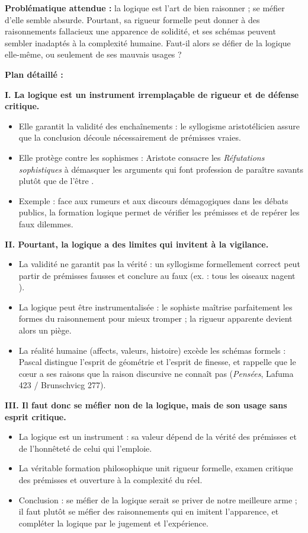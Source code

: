 \documentclass[11pt]{article}
\begin{document}
\begin{corrige}
\textbf{Problématique attendue :} la logique est l'art de bien raisonner ; se méfier d'elle semble absurde. Pourtant, sa rigueur formelle peut donner à des raisonnements fallacieux une apparence de solidité, et ses schémas peuvent sembler inadaptés à la complexité humaine. Faut-il alors se défier de la logique elle-même, ou seulement de ses mauvais usages ?

\textbf{Plan détaillé :}

\textbf{I. La logique est un instrument irremplaçable de rigueur et de défense critique.}
\begin{itemize}
\item Elle garantit la validité des enchaînements : le syllogisme aristotélicien assure que la conclusion découle nécessairement de prémisses vraies.
\item Elle protège contre les sophismes : Aristote consacre les \emph{Réfutations sophistiques} à démasquer les arguments qui \guillemotleft font profession de paraître savants plutôt que de l'être \guillemotright.
\item Exemple : face aux rumeurs et aux discours démagogiques dans les débats publics, la formation logique permet de vérifier les prémisses et de repérer les faux dilemmes.
\end{itemize}

\textbf{II. Pourtant, la logique a des limites qui invitent à la vigilance.}
\begin{itemize}
\item La validité ne garantit pas la vérité : un syllogisme formellement correct peut partir de prémisses fausses et conclure au faux (ex. : \guillemotleft tous les oiseaux nagent \guillemotright).
\item La logique peut être instrumentalisée : le sophiste maîtrise parfaitement les formes du raisonnement pour mieux tromper ; la rigueur apparente devient alors un piège.
\item La réalité humaine (affects, valeurs, histoire) excède les schémas formels : Pascal distingue l'esprit de géométrie et l'esprit de finesse, et rappelle que le cœur a ses raisons que la raison discursive ne connaît pas (\emph{Pensées}, Lafuma 423 / Brunschvicg 277).
\end{itemize}

\textbf{III. Il faut donc se méfier non de la logique, mais de son usage sans esprit critique.}
\begin{itemize}
\item La logique est un instrument : sa valeur dépend de la vérité des prémisses et de l'honnêteté de celui qui l'emploie.
\item La véritable formation philosophique unit rigueur formelle, examen critique des prémisses et ouverture à la complexité du réel.
\item Conclusion : se méfier de la logique serait se priver de notre meilleure arme ; il faut plutôt se méfier des raisonnements qui en imitent l'apparence, et compléter la logique par le jugement et l'expérience.
\end{itemize}


\end{corrige}
\end{document}
